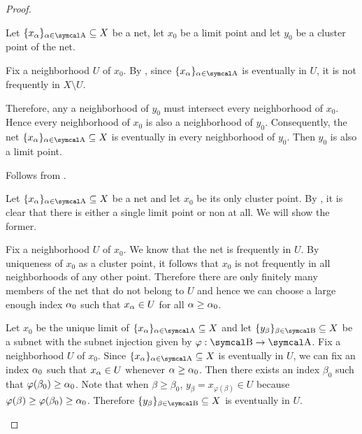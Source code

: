 \begin{proposition}
\begin{proof}
\begin{description}
     Let \( \{ x_\al \}_{\al \in \CA} \subseteq X \) be a net, let \( x_0 \) be a limit point and let \( y_0 \) be a cluster point of the net.

    Fix a neighborhood \( U \) of \( x_0 \). By , since \( \{ x_\al \}_{\al \in \CA} \) is eventually in \( U \), it is not frequently in \( X \setminus U \).

    Therefore, any a neighborhood of \( y_0 \) must intersect every neighborhood of \( x_0 \). Hence every neighborhood of \( x_0 \) is also a neighborhood of \( y_0 \). Consequently, the net \( \{ x_\al \}_{\al \in \CA} \subseteq X \) is eventually in every neighborhood of \( y_0 \). Then \( y_0 \) is also a limit point.

    \mbox{}
    \begin{description}
      \Implies Follows from .

      \ImpliedBy Let \( \{ x_\al \}_{\al \in \CA} \subseteq X \) be a net and let \( x_0 \) be its only cluster point. By , it is clear that there is either a single limit point or non at all. We will show the former.

      Fix a neighborhood \( U \) of \( x_0 \). We know that the net is frequently in \( U \). By uniqueness of \( x_0 \) as a cluster point, it follows that \( x_0 \) is not frequently in all neighborhoods of any other point. Therefore there are only finitely many members of the net that do not belong to \( U \) and hence we can choose a large enough index \( \alpha_0 \) such that \( x_\alpha \in U \) for all \( \alpha \geq \alpha_0 \).
    \end{description}

    \mbox{}
    \begin{description}
      \Implies Let \( x_0 \) be the unique limit of \( \{ x_\al \}_{\al \in \CA} \subseteq X \) and let \( \{ y_\beta \}_{\beta \in \CB} \subseteq X \) be a subnet with the subnet injection given by \( \varphi: \CB \to \CA \). Fix a neighborhood \( U \) of \( x_0 \). Since \( \{ x_\al \}_{\al \in \CA} \subseteq X \) is eventually in \( U \), we can fix an index \( \alpha_0 \) such that \( x_\alpha \in U \) whenever \( \alpha \geq \alpha_0 \). Then there exists an index \( \beta_0 \) such that \( \varphi(\beta_0) \geq \alpha_0 \). Note that when \( \beta \geq \beta_0 \), \( y_\beta = x_{\varphi(\beta)} \in U \) because \( \varphi(\beta) \geq \varphi(\beta_0) \geq \alpha_0 \). Therefore \( \{ y_\beta \}_{\beta \in \CB} \subseteq X \) is eventually in \( U \).


\end{description}
\end{description}
\end{proof}
\end{proposition}
